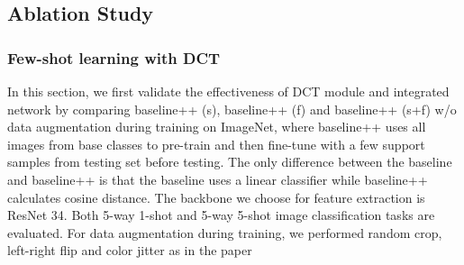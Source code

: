 \documentclass[10pt, conference, compsocconf]{IEEEtran}
\begin{document}
\begin{comment}
The results are shown in Table \ref{table6}. It is evident that our method can increase the accuracy of the state-of-the-art for all datasets we tested, including mini-Imagenet, CUB datasets and CIFAR-FS. , and achieve a new state-of-the-art, 85.010.22 for 5-way 1-shot and 90.720.11 for 5-way 5-shot on miniImagenet, 95.450.13 for 5-way 1-shot and 96.700.07 for 5-way 5-shot on CUB, and 89.390.21 for 5-way 1-shot and 92.080.15 for 5-way 5-shot on CIFAR-FS. One interesting observation on CIFAR-FS is that, the accuracy increased by 1.7 and 1.4 for 5-way 1-shot and 5-way 5-shot tasks respectively, which are less than improvement on miniImageNet and CUB. The reason might be images in CIFAR-FS are smaller, only 3232, and the spatial version uses 3232 as its input size. So no additional information could be included in frequency version, which is different from miniImageNet and CUB when we uses 8484 or 224224 as the input size for spatial version, while the original images are larger than that. This result also concedes with conclusion in table \ref{table2}. Another reason for this might be the frequency branch will resize the original 32 32 images in CIFAR-FS dataset to 448448 and the upsampling effect decreases greatly.
\end{comment}

\subsection{Ablation Study}

\subsubsection{Few-shot learning with DCT}



In this section, we first validate the effectiveness of DCT module and integrated network by comparing baseline++ (s), baseline++ (f) and baseline++ (s+f) w/o data augmentation during training on ImageNet, where baseline++ \cite{chen2019closer} uses all images from base classes to pre-train and then fine-tune with a few support samples from testing set before testing. The only difference between the baseline \cite{qi2018low} and baseline++ is that the baseline uses a linear classifier while baseline++ calculates cosine distance. The backbone we choose for feature extraction is ResNet 34. Both 5-way 1-shot and 5-way 5-shot image classification tasks are evaluated. {}{For data augmentation during training, we performed random crop, left-right flip and color jitter as in the paper \cite{chen2019closer}}
\end{document}

